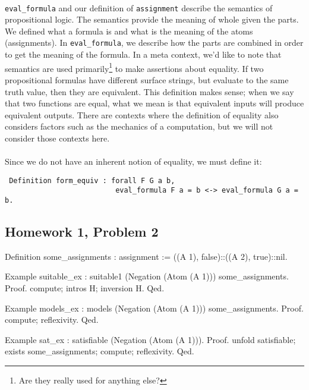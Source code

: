 \documentclass{article}
\begin{document}
\paragraph{} \verb|eval_formula| and our definition of \verb|assignment| describe the semantics of propositional logic. The semantics provide the meaning of whole given the parts. We defined what a formula is and what is the meaning of the atoms (assignments). In \verb|eval_formula|, we describe how the parts are combined in order to get the meaning of the formula. In a meta context, we'd like to note that semantics are used primarily\footnote{Are they really used for anything else?} to make assertions about equality. If two propositional formulas have different surface strings, but evaluate to the same truth value, then they are equivalent. This definition makes sense; when we say that two functions are equal, what we mean is that equivalent inputs will produce equivalent outputs. There are contexts where the definition of equality also considers factors such as the mechanics of a computation, but we will not consider those contexts here. 

\paragraph{}
Since we do not have an inherent notion of equality, we must define it:

\begin{lstlisting}
 Definition form_equiv : forall F G a b,                                                                                                                                                                     
                          eval_formula F a = b <-> eval_formula G a = b.
\end{lstlisting}

\subsection{Homework 1, Problem 2}


Definition some_assignments : assignment := ((A 1), false)::((A 2), true)::nil.

Example suitable_ex : suitable1 (Negation (Atom (A 1))) some_assignments.
Proof. compute; intros H; inversion H. Qed.

Example models_ex : models (Negation (Atom (A 1))) some_assignments.
Proof. compute; reflexivity. Qed.

Example sat_ex : satisfiable (Negation (Atom (A 1))).
Proof. unfold satisfiable; exists some_assignments; compute; reflexivity. Qed.
\end{document}
